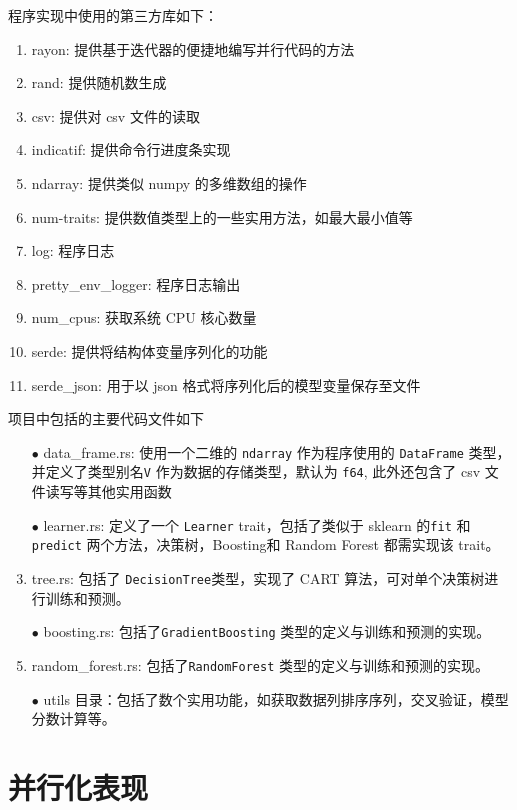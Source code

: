 \documentclass[12pt]{article}
\begin{document}
程序实现中使用的第三方库如下：
\begin{enumerate}
    \item rayon: 提供基于迭代器的便捷地编写并行代码的方法
    \item rand: 提供随机数生成
    \item csv: 提供对 csv 文件的读取
    \item indicatif: 提供命令行进度条实现
    \item ndarray: 提供类似 numpy 的多维数组的操作
    \item num-traits: 提供数值类型上的一些实用方法，如最大最小值等
    \item log: 程序日志
    \item pretty\_env\_logger: 程序日志输出
    \item num\_cpus: 获取系统 CPU 核心数量
    \item serde: 提供将结构体变量序列化的功能
    \item serde\_json: 用于以 json 格式将序列化后的模型变量保存至文件
\end{enumerate}

项目中包括的主要代码文件如下
\begin{enumerate}
    \item[$\bullet$] data\_frame.rs: 使用一个二维的 \lstinline{ndarray} 作为程序使用的 \lstinline{DataFrame} 类型，并定义了类型别名\lstinline{V} 作为数据的存储类型，默认为 \lstinline{f64}, 此外还包含了 csv 文件读写等其他实用函数
    \item[$\bullet$] learner.rs: 定义了一个 \lstinline{Learner} trait，包括了类似于 sklearn 的\lstinline{fit} 和\lstinline{predict} 两个方法，决策树，Boosting和 Random Forest 都需实现该 trait。
    \item[$\bullet$] tree.rs: 包括了 \lstinline{DecisionTree}类型，实现了 CART 算法，可对单个决策树进行训练和预测。
    \item[$\bullet$] boosting.rs: 包括了\lstinline{GradientBoosting} 类型的定义与训练和预测的实现。
    \item[$\bullet$] random\_forest.rs: 包括了\lstinline{RandomForest} 类型的定义与训练和预测的实现。
    \item[$\bullet$] utils 目录：包括了数个实用功能，如获取数据列排序序列，交叉验证，模型分数计算等。

\end{enumerate}

\section{并行化表现}
\end{document}

